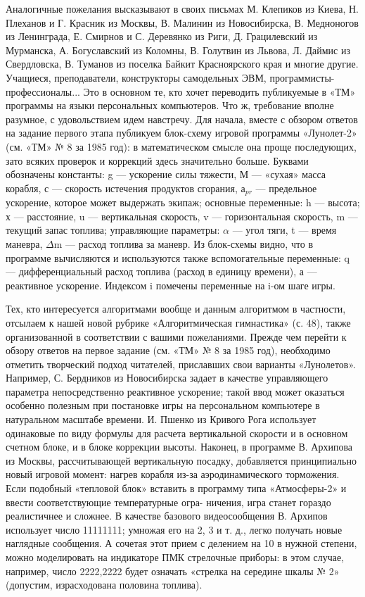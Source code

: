 \documentclass[11pt,a4paper,oneside]{article}
\begin{document}
Аналогичные пожелания высказывают в своих письмах М. Клепиков из Киева, Н. Плеханов и Г. Красник из Москвы, В. Малинин из Новосибирска, В. Медноногов из Ленинграда, Е. Смирнов и С. Деревянко из Риги, Д. Грацилевский из Мурманска, А. Богуславский из Коломны, В. Голутвин из Львова, Л. Даймис из Свердловска, В. Туманов из поселка Байкит Красноярского края и многие другие. Учащиеся, преподаватели, конструкторы самодельных ЭВМ, программисты-профессионалы... Это в основном те, кто хочет переводить публикуемые в «ТМ» программы на языки персональных компьютеров. Что ж, требование вполне разумное, с удовольствием идем навстречу. Для начала, вместе с обзором ответов на задание первого этапа публикуем блок-схему игровой программы «Лунолет-2» (см. «ТМ» № 8 за 1985 год): в математическом смысле она проще последующих, зато всяких проверок и коррекций здесь значительно больше. Буквами обозначены константы: g — ускорение силы тяжести, М — «сухая» масса корабля, с — скорость истечения продуктов сгорания, а$_{pr}$ — предельное ускорение, которое может выдержать экипаж; основные переменные: h — высота; х — расстояние, u — вертикальная скорость, v — горизонтальная скорость, m — текущий запас топлива; управляющие параметры: $\alpha$ — угол тяги, t — время маневра, $\Delta$m — расход топлива за маневр. Из блок-схемы видно, что в программе вычисляются и используются также вспомогательные переменные: q — дифференциальный расход топлива (расход в единицу времени), а — реактивное ускорение. Индексом i помечены переменные на i-ом шаге игры.

Тех, кто интересуется алгоритмами вообще и данным алгоритмом в частности, отсылаем к нашей новой рубрике «Алгоритмическая гимнастика» (с. 48), также организованной в соответствии с вашими пожеланиями. Прежде чем перейти к обзору ответов на первое задание (см. «ТМ» № 8 за 1985 год), необходимо отметить творческий подход читателей, приславших свои варианты «Лунолетов». Например, С. Бердников из Новосибирска задает в качестве управляющего параметра непосредственно реактивное ускорение; такой ввод может оказаться особенно полезным при постановке игры на персональном компьютере в натуральном масштабе времени. И. Пшенко из Кривого Рога использует одинаковые по виду формулы для расчета вертикальной скорости и в основном счетном блоке, и в блоке коррекции высоты. Наконец, в программе В. Архипова из Москвы, рассчитывающей вертикальную посадку, добавляется принципиально новый игровой момент: нагрев корабля из-за аэродинамического торможения. Если подобный «тепловой блок» вставить в программу типа «Атмосферы-2» и ввести соответствующие температурные огра- ничения, игра станет гораздо реалистичнее и сложнее. В качестве базового видеосообщения В. Архипов использует число 11111111; умножая его на 2, 3 и т. д., легко получать новые наглядные сообщения. А сочетая этот прием с делением на 10 в нужной степени, можно моделировать на индикаторе ПМК стрелочные приборы: в этом случае, например, число 2222,2222 будет означать «стрелка на середине шкалы № 2» (допустим, израсходована половина топлива).
\end{document}
